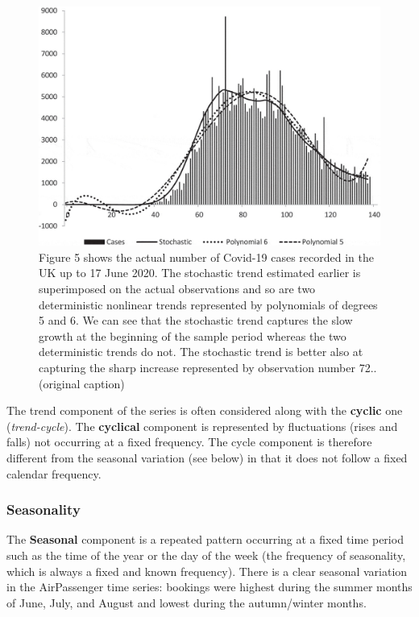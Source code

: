 \documentclass[
]{article}
\begin{document}
\begin{figure}
\includegraphics[width=16.67in]{images/covid-trends} \caption{Figure 5 shows the actual number of Covid-19 cases recorded in the UK up to 17 June 2020. The stochastic trend estimated earlier is superimposed on the actual observations and so are two deterministic nonlinear trends represented by polynomials of degrees 5 and 6. We can see that the stochastic trend captures the slow growth at the beginning of the sample period whereas the two deterministic trends do not. The stochastic trend is better also at capturing the sharp increase represented by observation number 72.. (original caption)}\label{fig:unnamed-chunk-108}
\end{figure}

The trend component of the series is often considered along with the \textbf{cyclic} one (\emph{trend-cycle}). The \textbf{cyclical} component is represented by fluctuations (rises and falls) not occurring at a fixed frequency. The cycle component is therefore different from the seasonal variation (see below) in that it does not follow a fixed calendar frequency.

\hypertarget{seasonality}{%
\subsubsection{Seasonality}\label{seasonality}}

The \textbf{Seasonal} component is a repeated pattern occurring at a fixed time period such as the time of the year or the day of the week (the frequency of seasonality, which is always a fixed and known frequency). There is a clear seasonal variation in the AirPassenger time series: bookings were highest during the summer months of June, July, and August and lowest during the autumn/winter months.
\end{document}
